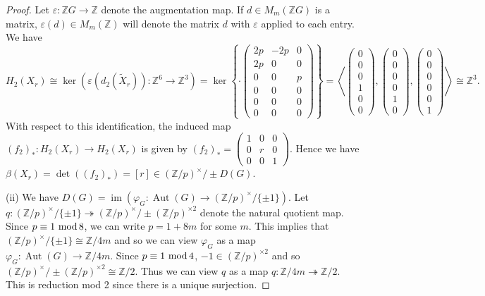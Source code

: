 \documentclass[11pt,a4paper,leqno]{amsart}
\theoremstyle{definition}
\theoremstyle{remark}
\newcommand{\wt}{\widetilde}
\newcommand{\Z}{\mathbb{Z}}
\renewcommand{\mod}{\,\,\text{\normalfont mod}\,}
\DeclareMathOperator{\Aut}{Aut}
\DeclareMathOperator{\IM}{im}
\begin{document}
\begin{proof}
Let $\varepsilon\colon\Z G \to \Z$ denote the augmentation map. If $d \in M_m(\Z G)$ is a matrix, $\varepsilon(d) \in M_m(\Z)$ will denote the matrix $d$ with $\varepsilon$ applied to each entry.
We have 
\[ H_2(X_r) \cong \ker(\varepsilon(d_2(\wt X_r)):\Z^6 \to \Z^3) = \ker \left\{ \cdot \left(\begin{smallmatrix} 
2p & -2p & 0 \\
2p & 0 & 0 \\
0 & 0 & p \\
0 & 0 & 0 \\
0 & 0 & 0 \\
0 & 0 & 0
\end{smallmatrix}\right) \right\} = \left\langle
\left(\begin{smallmatrix}
	 0 \\ 0 \\ 0 \\ 1 \\ 0 \\ 0
\end{smallmatrix} \right),
\left(\begin{smallmatrix}
	 0 \\ 0 \\ 0 \\ 0 \\ 1 \\ 0
\end{smallmatrix} \right),
\left(\begin{smallmatrix}
	 0 \\ 0 \\ 0 \\ 0 \\ 0 \\ 1
\end{smallmatrix} \right)
\right\rangle \cong \Z^3.
\] 
With respect to this identification, the induced map $(f_2)_*\colon H_2(X_r) \to H_2(X_r)$ is given by $(f_2)_* = \left(\begin{smallmatrix}
	1 & 0 & 0 \\ 0 & r & 0 \\ 0 & 0 & 1
\end{smallmatrix}\right)$.
Hence we have $\beta(X_r) = \det((f_2)_*) = [r] \in (\Z/p)^\times/\pm D(G)$.

(ii) We have $D(G) = \IM(\varphi_G\colon\Aut(G) \to (\Z/p)^\times/\{\pm 1\})$. Let $q\colon(\Z/p)^\times/\{\pm 1\} \twoheadrightarrow (\Z/p)^\times/\pm(\Z/p)^{\times 2}$ denote the natural quotient map.
Since $p \equiv 1 \mod 8$, we can write $p = 1+8m$ for some $m$. This implies that $(\Z/p)^\times/\{\pm 1\} \cong \Z/4m$ and so we can view $\varphi_G$ as a map $\varphi_G\colon\Aut(G) \to \Z/4m$. Since $p \equiv 1 \mod 4$, $-1 \in (\Z/p)^{\times 2}$ and so $(\Z/p)^\times/\pm(\Z/p)^{\times 2} \cong \Z/2$. Thus we can view $q$ as a map $q\colon\Z/4m \twoheadrightarrow \Z/2$. This is reduction mod 2 since there is a unique surjection.


\end{proof}
\end{document}
